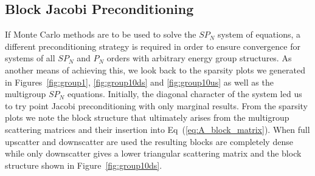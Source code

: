 \subsection{Block Jacobi Preconditioning}
\label{sec:spn_preconditioning}
If Monte Carlo methods are to be used to solve the $SP_N$ system of
equations, a different preconditioning strategy is required in order
to ensure convergence for systems of all $SP_N$ and $P_N$ orders with
arbitrary energy group structures. As another means of achieving this,
we look back to the sparsity plots we generated in
Figures~\ref{fig:group1}, \ref{fig:group10ds} and \ref{fig:group10us}
as well as the multigroup $SP_N$ equations. Initially, the diagonal
character of the system led us to try point Jacobi preconditioning
with only marginal results. From the sparsity plots we note the block
structure that ultimately arises from the multigroup scattering
matrices and their insertion into Eq~(\ref{eq:A_block_matrix}). When
full upscatter and downscatter are used the resulting blocks are
completely dense while only downscatter gives a lower triangular
scattering matrix and the block structure shown in
Figure~\ref{fig:group10ds}.

